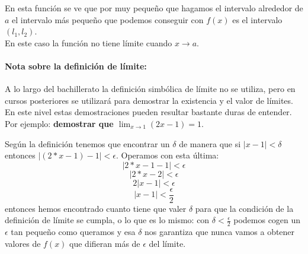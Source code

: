 \documentclass[a4paper,11pt,answers]{exam}
\begin{document}
En esta función se ve que por muy pequeño que hagamos el intervalo alrededor de $a$ el intervalo más pequeño que podemos conseguir con $f(x)$ es el intervalo $(l_1, l_2)$.\\
En este caso la función no tiene límite cuando $x \to a$.

\paragraph*{Nota sobre la definición de límite:}
\begin{small}
A lo largo del bachillerato la definición simbólica de límite no se utiliza, pero en cursos posteriores se utilizará para demostrar la existencia y el valor de límites. En este nivel estas demostraciones pueden resultar bastante duras de entender.\\
Por ejemplo: \textbf{demostrar que $\lim_{x \to 1} (2x - 1) = 1$}.\\
\begin{solution}
Según la definición tenemos que encontrar un $\delta$ de manera que si $|x-1|<\delta$ entonces $|(2*x -1) - 1|<\epsilon$. Operamos con esta última:
\[|2*x - 1 - 1| < \epsilon\]
\[|2*x-2| <\epsilon\]
\[2|x-1| < \epsilon\]
\[|x-1| < \frac{\epsilon}{2}\]
entonces hemos encontrado cuanto tiene que valer $\delta$ para que la condición de la definición de límite se cumpla, o lo que es lo mismo: con $\delta < \frac{\epsilon}{2}$ podemos cogen un $\epsilon$ tan pequeño como queramos y esa $\delta$ nos garantiza que nunca vamos a obtener valores de $f(x)$ que difieran más de $\epsilon$ del límite.
\end{solution}

\end{small}
\end{document}
